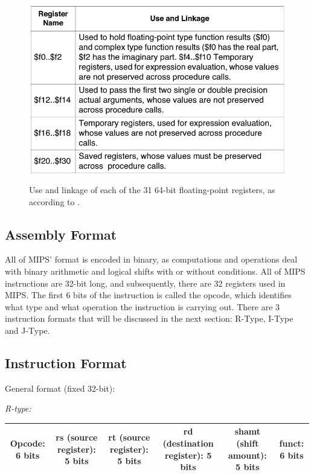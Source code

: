 \documentclass[
    parskip=half,
    fontsize=12pt,
    titlepage=firstiscover,
    toc=bibliography,
    numbers=endperiod
]{scrartcl}
\begin{document}
\begin{figure}[H]
    \includegraphics[height=8cm]{fpr-names}
    \caption{Use and linkage of each of the 31 64-bit floating-point
    registers, as according to \protect\cite[Table~1-3]{mips-programmers-guide}.}
\end{figure}

\subsection{Assembly Format}

All of MIPS' format is encoded in binary, as computations and operations
deal with binary arithmetic and logical shifts with or without
conditions. All of MIPS instructions are 32-bit long, and subsequently,
there are 32 registers used in MIPS. The first 6 bits of the instruction
is called the opcode, which identifies what type and what operation the
instruction is carrying out. There are 3 instruction formats that will
be discussed in the next section: R-Type, I-Type and J-Type.

\subsection{Instruction Format}

General format (fixed 32-bit):

\emph{R-type:}

\begin{tabularx}{\textwidth}{@{}|C|C|C|C|C|C|@{}}
    \hline
    Opcode: 6 bits & rs (source register): 5 bits & rt (source register): 5 bits & rd (destination register): 5 bits & shamt (shift amount): 5 bits & funct: 6 bits \\
    \hline
\end{tabularx}
\end{document}
